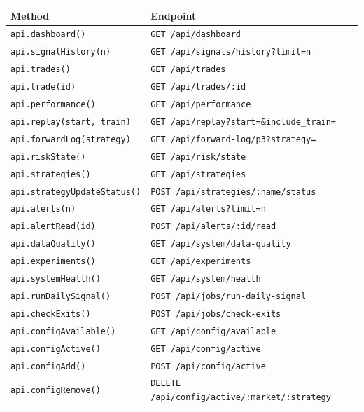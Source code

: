 \documentclass[12pt, a4paper]{article}
\begin{document}
\begin{table}[H]
\centering\small
\begin{tabular}{ll}
\toprule
Method & Endpoint \\
\midrule
\texttt{api.dashboard()}            & \texttt{GET /api/dashboard} \\
\texttt{api.signalHistory(n)}       & \texttt{GET /api/signals/history?limit=n} \\
\texttt{api.trades()}               & \texttt{GET /api/trades} \\
\texttt{api.trade(id)}              & \texttt{GET /api/trades/:id} \\
\texttt{api.performance()}          & \texttt{GET /api/performance} \\
\texttt{api.replay(start, train)}   & \texttt{GET /api/replay?start=\&include\_train=} \\
\texttt{api.forwardLog(strategy)}   & \texttt{GET /api/forward-log/p3?strategy=} \\
\texttt{api.riskState()}            & \texttt{GET /api/risk/state} \\
\texttt{api.strategies()}           & \texttt{GET /api/strategies} \\
\texttt{api.strategyUpdateStatus()} & \texttt{POST /api/strategies/:name/status} \\
\texttt{api.alerts(n)}              & \texttt{GET /api/alerts?limit=n} \\
\texttt{api.alertRead(id)}          & \texttt{POST /api/alerts/:id/read} \\
\texttt{api.dataQuality()}          & \texttt{GET /api/system/data-quality} \\
\texttt{api.experiments()}          & \texttt{GET /api/experiments} \\
\texttt{api.systemHealth()}         & \texttt{GET /api/system/health} \\
\texttt{api.runDailySignal()}       & \texttt{POST /api/jobs/run-daily-signal} \\
\texttt{api.checkExits()}           & \texttt{POST /api/jobs/check-exits} \\
\texttt{api.configAvailable()}      & \texttt{GET /api/config/available} \\
\texttt{api.configActive()}         & \texttt{GET /api/config/active} \\
\texttt{api.configAdd()}            & \texttt{POST /api/config/active} \\
\texttt{api.configRemove()}         & \texttt{DELETE /api/config/active/:market/:strategy} \\
\bottomrule
\end{tabular}
\end{table}
\end{document}
